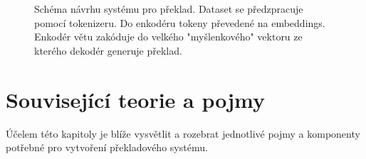 \begin{figure}[h]
    \begin{center}
    \end{center}
	\caption{Schéma návrhu systému pro překlad. Dataset se předzpracuje pomocí tokenizeru. Do enkodéru tokeny převedené na embeddings. Enkodér větu zakóduje do velkého "myšlenkového" vektoru ze kterého dekodér generuje překlad.}
	\label{img:draft}
\end{figure}


\chapter{Související teorie a pojmy}\label{chapter:theory}
Účelem této kapitoly je blíže vysvětlit a rozebrat jednotlivé pojmy a komponenty potřebné pro vytvoření překladového systému.



